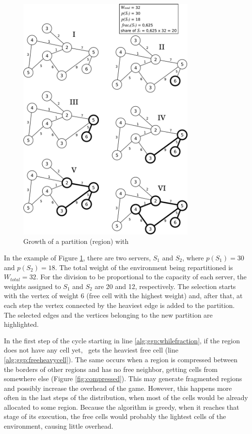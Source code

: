 \begin{figure}
\centering
\includegraphics[width=0.8\textwidth]{images/ggp}
\caption{Growth of a partition (region) with \ggp}
\label{fig:ggp}
\end{figure}

In the example of Figure \ref{fig:ggp}, there are two servers, $S_1$ and $S_2$, where $p(S_1) = 30$ and $p(S_2) = 18$. The total weight of the environment being repartitioned is $W_{total} = 32$. For the division to be proportional to the capacity of each server, the weights assigned to $S_1 $ and $S_2$ are 20 and 12, respectively. The selection starts with the vertex of weight 6 (free cell with the highest weight) and, after that, at each step the vertex connected by the heaviest edge is added to the partition. The selected edges and the vertices belonging to the new partition are highlighted.

In the first step of the cycle starting in line \ref{alg:ggp:whilefraction}, if the region does not have any cell yet, \ggp\ gets the heaviest free cell (line \ref{alg:ggp:freeheavycell}). The same occurs when a region is compressed between the borders of other regions and has no free neighbor, getting cells from somewhere else (Figure \ref{fig:compressed}). This may generate fragmented regions and possibly increase the overhead of the game. However, this happens more often in the last steps of the distribution, when most of the cells would be already allocated to some region. Because the algorithm is greedy, when it reaches that stage of its execution, the free cells would probably the lightest cells of the environment, causing little overhead.

